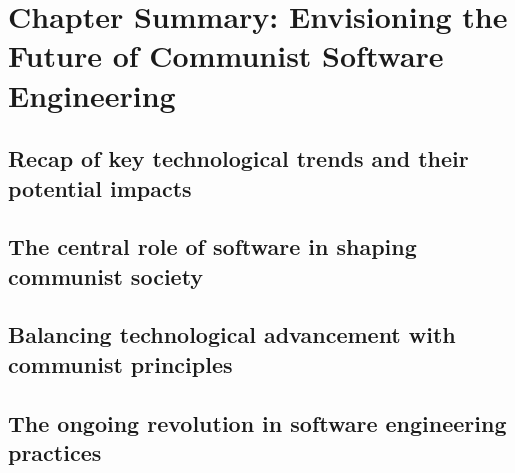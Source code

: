 \newpage

\section{Chapter Summary: Envisioning the Future of Communist Software Engineering}
\subsection{Recap of key technological trends and their potential impacts}
\subsection{The central role of software in shaping communist society}
\subsection{Balancing technological advancement with communist principles}
\subsection{The ongoing revolution in software engineering practices}